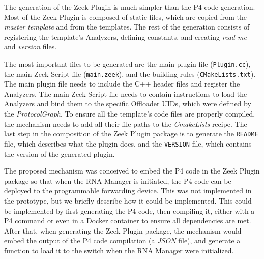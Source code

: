 The generation of the Zeek Plugin is much simpler than the P4 code generation. Most of the Zeek Plugin is composed of static files, which are copied from the \textit{master template} and from the templates. The rest of the generation consists of registering the template's Analyzers, defining constants, and creating \textit{read me} and \textit{version} files.

The most important files to be generated are the main plugin file (\texttt{Plugin.cc}), the main Zeek Script file (\texttt{main.zeek}), and the building rules (\texttt{CMakeLists.txt}). The main plugin file needs to include the C++ header files and register the Analyzers. The main Zeek Script file needs to contain instructions to load the Analyzers and bind them to the specific Offloader UIDs, which were defined by the \textit{ProtocolGraph}. To ensure all the template's code files are properly compiled, the mechanism needs to add all their file paths to the \textit{CmakeLists} recipe. The last step in the composition of the Zeek Plugin package is to generate the \texttt{README} file, which describes what the plugin does, and the \texttt{VERSION} file, which contains the version of the generated plugin.

The proposed mechanism was conceived to embed the P4 code in the Zeek Plugin package so that when the RNA Manager is initiated, the P4 code can be deployed to the programmable forwarding device. This was not implemented in the prototype, but we briefly describe how it could be implemented. This could be implemented by first generating the P4 code, then compiling it, either with a P4 command or even in a Docker container to ensure all dependencies are met. After that, when generating the Zeek Plugin package, the mechanism would embed the output of the P4 code compilation (a \textit{JSON} file), and generate a function to load it to the switch when the RNA Manager were initialized.


